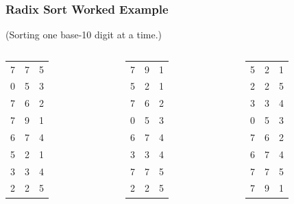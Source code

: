 \documentclass[10pt,aspectratio=169]{beamer}
\begin{document}
\begin{frame} \frametitle{Radix Sort Worked Example}
\begin{center}
(Sorting one base-10 digit at a time.)
\begin{columns}
\begin{column}{0.25\textwidth}
  \begin{center}
    \begin{tabular}{ccg}
      7&7&5 \\
      0&5&3 \\
      7&6&2 \\
      7&9&1 \\
      6&7&4 \\
      5&2&1 \\
      3&3&4 \\
      2&2&5 \\
    \end{tabular}
  \end{center}
\end{column}
\begin{column}{0.25\textwidth}
  \begin{center}
    \begin{tabular}{cgc}
      7&9&1 \\
      5&2&1 \\
      7&6&2 \\
      0&5&3 \\
      6&7&4 \\
      3&3&4 \\
      7&7&5 \\
      2&2&5 \\
    \end{tabular}
  \end{center}
\end{column}
\begin{column}{0.25\textwidth}
  \begin{center}
    \begin{tabular}{gcc}
      5&2&1 \\
      2&2&5 \\
      3&3&4 \\
      0&5&3 \\
      7&6&2 \\
      6&7&4 \\
      7&7&5 \\
      7&9&1 \\
    \end{tabular}
  \end{center}
\end{column}

\end{columns}
\end{center}
\end{frame}
\end{document}
